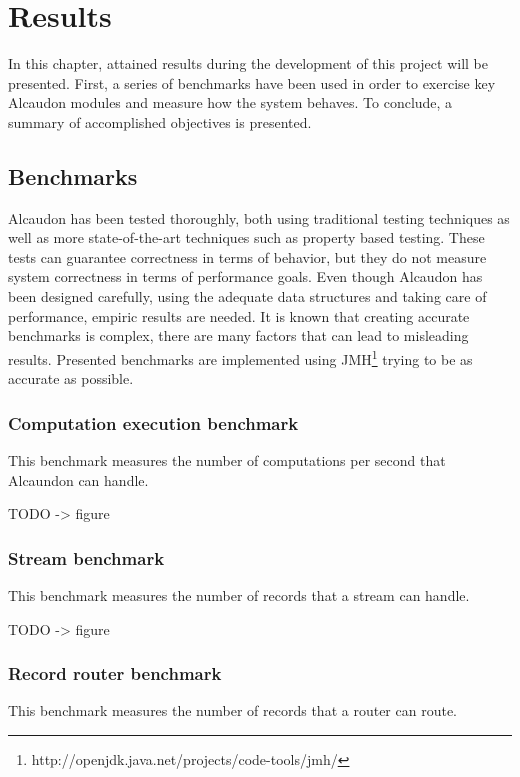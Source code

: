 \chapter{Results}

In this chapter, attained results during the development of this project will be
presented. First, a series of benchmarks have been used in order to
exercise key Alcaudon modules and measure how the system behaves. To conclude,
a summary of accomplished objectives is presented.

\section{Benchmarks}

Alcaudon has been tested thoroughly, both using traditional testing techniques
as well as more state-of-the-art techniques such as property based testing.
These tests can guarantee correctness in terms of behavior, but they do not
measure system correctness in terms of performance goals. Even though Alcaudon
has been designed carefully, using the adequate data structures and taking
care of performance, empiric results are needed. It is known that creating
accurate benchmarks is complex\cite{benchbias}, there are many factors
that can lead to misleading results. Presented benchmarks are implemented using
JMH\footnote{http://openjdk.java.net/projects/code-tools/jmh/} trying to be as
accurate as possible.

\subsection{Computation execution benchmark}

This benchmark measures the number of computations per second that Alcaundon can
handle.

TODO -> figure

\subsection{Stream benchmark}

This benchmark measures the number of records that a stream can handle.

TODO -> figure

\subsection{Record router benchmark}

This benchmark measures the number of records that a router can route.

